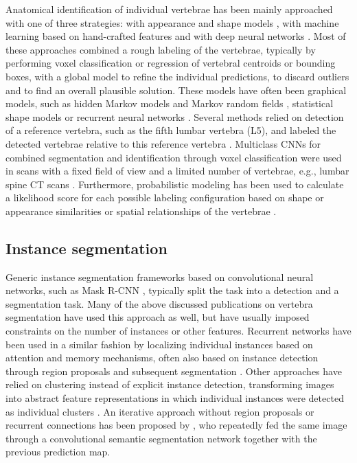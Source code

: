 \documentclass[authoryear,5p,final,times]{elsarticle}
\begin{document}
    Anatomical identification of individual vertebrae has been mainly approached with one of three strategies: with appearance and shape models \citep{Klinder2009,Glocker2012,Cai2015}, with machine learning based on hand-crafted features \citep{Chu2015,Glocker2012,Glocker2013,Major2013,Kelm2013,Suzani2015,Bromiley2016} and with deep neural networks \citep{Cai2016,Chen2015,Forsberg2017,Liao2018,Yang2017,Yang2017b,Janssens2018,Sekuboyina2017,Lessmann2018b}. Most of these approaches combined a rough labeling of the vertebrae, typically by performing voxel classification or regression of vertebral centroids or bounding boxes, with a global model to refine the individual predictions, to discard outliers and to find an overall plausible solution. These models have often been graphical models, such as hidden Markov models \citep{Chu2015,Glocker2012} and Markov random fields \citep{Major2013}, statistical shape models \citep{Bromiley2016,Suzani2015,Chen2015} or recurrent neural networks \citep{Yang2017b,Liao2018}. Several methods relied on detection of a reference vertebra, such as the fifth lumbar vertebra (L5), and labeled the detected vertebrae relative to this reference vertebra \citep{Cai2016,Forsberg2017,Lessmann2018b}. Multiclass CNNs for combined segmentation and identification through voxel classification were used in scans with a fixed field of view and a limited number of vertebrae, e.g., lumbar spine CT scans \citep{Sekuboyina2017,Janssens2018}. Furthermore, probabilistic modeling has been used to calculate a likelihood score for each possible labeling configuration based on shape or appearance similarities or spatial relationships of the vertebrae \citep{Glocker2013,Kelm2013,Chen2015,Klinder2009}.

    \subsection{Instance segmentation}

    Generic instance segmentation frameworks based on convolutional neural networks, such as Mask R-CNN \citep{He2017}, typically split the task into a detection and a segmentation task. Many of the above discussed publications on vertebra segmentation have used this approach as well, but have usually imposed constraints on the number of instances or other features. Recurrent networks have been used in a similar fashion by localizing individual instances based on attention and memory mechanisms, often also based on instance detection through region proposals and subsequent segmentation \citep{Stewart2016,RomeraParedes2016,Li2016,Ren2017}. Other approaches have relied on clustering instead of explicit instance detection, transforming images into abstract feature representations in which individual instances were detected as individual clusters \citep{Uhrig2016,DeBrabandere2017,Liang2018,Novotny2018}. An iterative approach without region proposals or recurrent connections has been proposed by \citet{Li2016}, who repeatedly fed the same image through a convolutional semantic segmentation network together with the previous prediction map.
\end{document}
